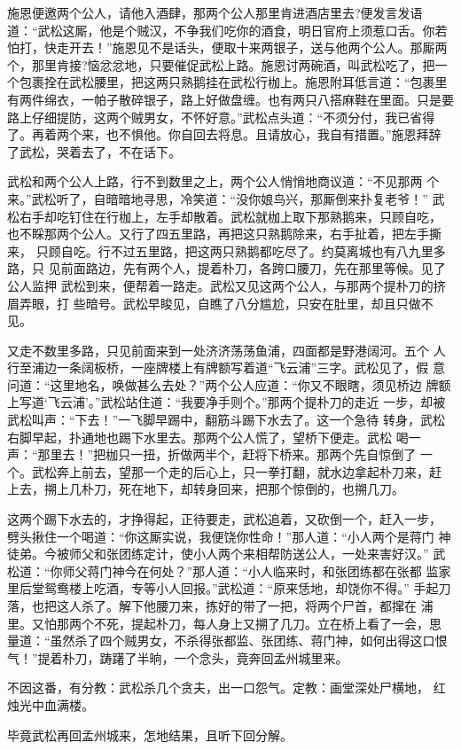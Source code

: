 施恩便邀两个公人，请他入酒肆，那两个公人那里肯进酒店里去?便发言发语
道：“武松这厮，他是个贼汉，不争我们吃你的酒食，明日官府上须惹口舌。你若
怕打，快走开去！”施恩见不是话头，便取十来两银子，送与他两个公人。那厮两
个，那里肯接?恼忿忿地，只要催促武松上路。施恩讨两碗酒，叫武松吃了，把一
个包裹拴在武松腰里，把这两只熟鹅挂在武松行枷上。施恩附耳低言道：“包裹里
有两件绵衣，一帕子散碎银子，路上好做盘缠。也有两只八搭麻鞋在里面。只是要
路上仔细提防，这两个贼男女，不怀好意。”武松点头道：“不须分付，我已省得
了。再着两个来，也不惧他。你自回去将息。且请放心，我自有措置。”施恩拜辞
了武松，哭着去了，不在话下。

武松和两个公人上路，行不到数里之上，两个公人悄悄地商议道：“不见那两
个来。”武松听了，自暗暗地寻思，冷笑道：“没你娘鸟兴，那厮倒来扑复老爷！”
武松右手却吃钉住在行枷上，左手却散着。武松就枷上取下那熟鹅来，只顾自吃，
也不睬那两个公人。又行了四五里路，再把这只熟鹅除来，右手扯着，把左手撕来，
只顾自吃。行不过五里路，把这两只熟鹅都吃尽了。约莫离城也有八九里多路，只
见前面路边，先有两个人，提着朴刀，各跨口腰刀，先在那里等候。见了公人监押
武松到来，便帮着一路走。武松又见这两个公人，与那两个提朴刀的挤眉弄眼，打
些暗号。武松早睃见，自瞧了八分尴尬，只安在肚里，却且只做不见。

又走不数里多路，只见前面来到一处济济荡荡鱼浦，四面都是野港阔河。五个
人行至浦边一条阔板桥，一座牌楼上有牌额写着道“飞云浦”三字。武松见了，假
意问道：“这里地名，唤做甚么去处？”两个公人应道：“你又不眼瞎，须见桥边
牌额上写道‘飞云浦’。”武松站住道：“我要净手则个。”那两个提朴刀的走近
一步，却被武松叫声：“下去！”一飞脚早踢中，翻筋斗踢下水去了。这一个急待
转身，武松右脚早起，扑通地也踢下水里去。那两个公人慌了，望桥下便走。武松
喝一声：“那里去！”把枷只一扭，折做两半个，赶将下桥来。那两个先自惊倒了
一个。武松奔上前去，望那一个走的后心上，只一拳打翻，就水边拿起朴刀来，赶
上去，搠上几朴刀，死在地下，却转身回来，把那个惊倒的，也搠几刀。

这两个踢下水去的，才挣得起，正待要走，武松追着，又砍倒一个，赶入一步，
劈头揪住一个喝道：“你这厮实说，我便饶你性命！”那人道：“小人两个是蒋门
神徒弟。今被师父和张团练定计，使小人两个来相帮防送公人，一处来害好汉。”
武松道：“你师父蒋门神今在何处？”那人道：“小人临来时，和张团练都在张都
监家里后堂鸳鸯楼上吃酒，专等小人回报。”武松道：“原来恁地，却饶你不得。”
手起刀落，也把这人杀了。解下他腰刀来，拣好的带了一把，将两个尸首，都撺在
浦里。又怕那两个不死，提起朴刀，每人身上又搠了几刀。立在桥上看了一会，思
量道：“虽然杀了四个贼男女，不杀得张都监、张团练、蒋门神，如何出得这口恨
气！”提着朴刀，踌躇了半晌，一个念头，竟奔回孟州城里来。

不因这番，有分教：武松杀几个贪夫，出一口怨气。定教：画堂深处尸横地，
红烛光中血满楼。

毕竟武松再回孟州城来，怎地结果，且听下回分解。